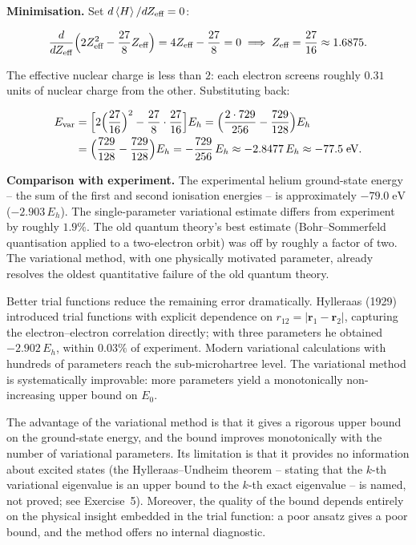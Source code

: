 \medskip\noindent\textbf{Minimisation.}
Set $d\braket{H}/dZ_{\text{eff}} = 0$:
\begin{linenomath}
\begin{equation*}
\frac{d}{dZ_{\text{eff}}}\Bigl(2Z_{\text{eff}}^{2} - \frac{27}{8}Z_{\text{eff}}\Bigr) = 4Z_{\text{eff}} - \frac{27}{8} = 0
\;\Longrightarrow\; Z_{\text{eff}} = \frac{27}{16} \approx 1.6875.
\end{equation*}
\end{linenomath}
The effective nuclear charge is less than $2$: each electron screens roughly $0.31$ units of nuclear charge from the other. Substituting back:
\begin{linenomath}
\begin{align}
E_{\text{var}} &= \Bigl[2\Bigl(\frac{27}{16}\Bigr)^{2} - \frac{27}{8}\cdot\frac{27}{16}\Bigr]E_{h}
= \Bigl(\frac{2\cdot 729}{256} - \frac{729}{128}\Bigr)E_{h} \nonumber \\
&= \Bigl(\frac{729}{128} - \frac{729}{128}\Bigr)E_{h}
= -\frac{729}{256}\,E_{h} \approx -2.8477\,E_{h} \approx -77.5\;\text{eV}.
\label{eq:helium-result}
\end{align}
\end{linenomath}

\medskip\noindent\textbf{Comparison with experiment.}
The experimental helium ground-state energy -- the sum of the first and second ionisation energies -- is approximately $-79.0\;\text{eV}$ ($-2.903\,E_{h}$). The single-parameter variational estimate differs from experiment by roughly $1.9\%$. The old quantum theory's best estimate (Bohr--Sommerfeld quantisation applied to a two-electron orbit) was off by roughly a factor of two. The variational method, with one physically motivated parameter, already resolves the oldest quantitative failure of the old quantum theory.

\begin{note}
Better trial functions reduce the remaining error dramatically. Hylleraas (1929) introduced trial functions with explicit dependence on $r_{12} = |\bm r_{1}-\bm r_{2}|$, capturing the electron--electron correlation directly; with three parameters he obtained $-2.902\,E_{h}$, within $0.03\%$ of experiment. Modern variational calculations with hundreds of parameters reach the sub-microhartree level. The variational method is systematically improvable: more parameters yield a monotonically non-increasing upper bound on $E_{0}$.
\end{note}

The advantage of the variational method is that it gives a rigorous upper bound on the ground-state energy, and the bound improves monotonically with the number of variational parameters. Its limitation is that it provides no information about excited states (the Hylleraas--Undheim theorem -- stating that the $k$-th variational eigenvalue is an upper bound to the $k$-th exact eigenvalue -- is named, not proved; see Exercise~5). Moreover, the quality of the bound depends entirely on the physical insight embedded in the trial function: a poor ansatz gives a poor bound, and the method offers no internal diagnostic.

